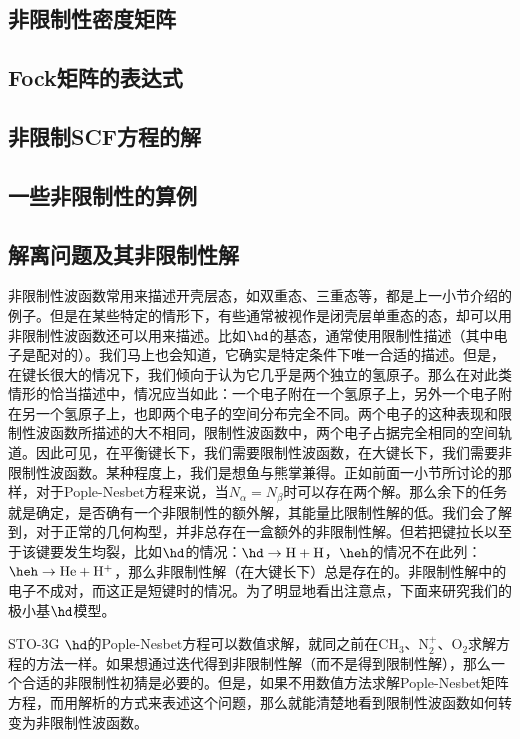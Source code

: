 \subsection{非限制性密度矩阵}
\subsection{Fock矩阵的表达式}
\subsection{非限制SCF方程的解}
\subsection{一些非限制性的算例}


\subsection{解离问题及其非限制性解}
非限制性波函数常用来描述开壳层态，如双重态、三重态等，都是上一小节介绍的例子。但是在某些特定的情形下，有些通常被视作是闭壳层单重态的态，却可以用非限制性波函数还可以用来描述。比如$\hd$的基态，通常使用限制性描述（其中电子是配对的）。我们马上也会知道，它确实是特定条件下唯一合适的\hft 描述。但是，在键长很大的情况下，我们倾向于认为它几乎是两个独立的氢原子。那么在对此类情形的恰当描述中，情况应当如此：一个电子附在一个氢原子上，另外一个电子附在另一个氢原子上，也即两个电子的空间分布完全不同。两个电子的这种表现和限制性波函数所描述的大不相同，限制性波函数中，两个电子占据完全相同的空间轨道。因此可见，在平衡键长下，我们需要限制性波函数，在大键长下，我们需要非限制性波函数。某种程度上，我们是想鱼与熊掌兼得。正如前面一小节所讨论的那样，对于Pople-Nesbet方程来说，当$N_\alpha=N_\beta$时可以存在两个解。那么余下的任务就是确定，是否确有一个非限制性的额外解，其能量比限制性解的低。我们会了解到，对于正常的几何构型，并非总存在一盒额外的非限制性解。但若把键拉长以至于该键要发生均裂，比如$\hd$的情况：$\hd\to \mathrm{H+H}$，$\heh$的情况不在此列：$\heh\to \mathrm{He+H^+}$，那么非限制性解（在大键长下）总是存在的。非限制性解中的电子不成对，而这正是短键时的情况。为了明显地看出注意点，下面来研究我们的极小基$\hd$模型。

STO-3G $\hd$的Pople-Nesbet方程可以数值求解，就同之前在$\mathrm{CH_3}$、$\mathrm{N_2^+}$、$\mathrm{O_2}$求解方程的方法一样。如果想通过迭代得到非限制性解（而不是得到限制性解），那么一个合适的非限制性初猜是必要的。但是，如果不用数值方法求解Pople-Nesbet矩阵方程，而用解析的方式来表述这个问题，那么就能清楚地看到限制性波函数如何转变为非限制性波函数。

